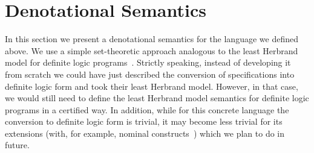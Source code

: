 \begin{comment}
\begin{figure}[t]
\[
\begin{array}{rcl}
  x\,[t/x] &=& t \\
  y\,[t/x] &=& y,\;\; y\ne x\\
  C_i^{k_i}\,(t_1,\dots,t_{k_i})\,[t/x]&=&C_i^{k_i}\,(t_1\,[t/x],\dots,t_{k_i}\,[t/x])\\
  (t_1 \equiv t_2)\,[t/x]&=&t_1\,[t/x] \equiv t_2\,[t/x]\\
  (g_1 \wedge g_2)\,[t/x]&=&g_1\,[t/x] \wedge g_2\,[t/x]\\
  (g_1 \vee g_2)\,[t/x]&=&g_1\,[t/x] \vee g_2\,[t/x]\\
  (\mbox{\lstinline|fresh|}\;x\,.\,g)\,[t/x]&=&\mbox{\lstinline|fresh|}\;x\,.\,g\\
  (\mbox{\lstinline|fresh|}\;y\,.\,g)\,[t/x]&=&\mbox{\lstinline|fresh|}\;y\,.\,(g\,[t/x]),\;\;y\ne x\\
  (R_i^{k_i}\,(t_1,\dots,t_{k_i})\,[t/x]&=&R_i^{k_i}\,(t_1\,[t/x],\dots,t_{k_i}\,[t/x])
\end{array}
\]
  \caption{Substitutions for terms and goals}
  \label{substitution}
\end{figure}
\end{comment}

\section{Denotational Semantics}
\label{denotational}

In this section we present a denotational semantics for the language we defined above. We use a simple set-theoretic
approach analogous to the least Herbrand model for definite logic programs~\cite{LHM}.
Strictly speaking, instead of developing it from scratch we could have just described the conversion of specifications
into definite logic form and took their least Herbrand model. However, in that case, we would still need to define
the least Herbrand model semantics for definite logic programs in a certified way. In addition, while for
this concrete language the conversion to definite logic form is trivial, it may become less trivial for
its extensions (with, for example, nominal constructs~\cite{AlphaKanren}) which we plan to do in future.

